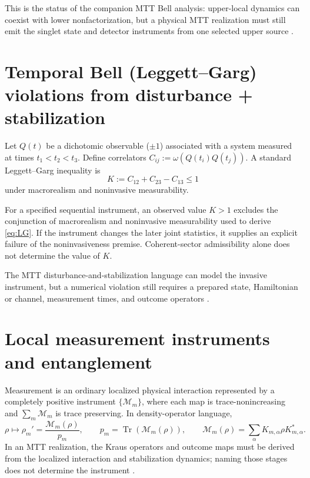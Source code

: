 \documentclass[11pt]{article}
\newcommand{\Tr}{\operatorname{Tr}}
\begin{document}
This is the status of the companion MTT Bell analysis: upper-local dynamics
can coexist with lower nonfactorization, but a physical MTT realization must
still emit the singlet state and detector instruments from one selected upper
source \cite{NeroBellBeables}.

\section{Temporal Bell (Leggett--Garg) violations from disturbance + stabilization}

Let $Q(t)$ be a dichotomic observable ($\pm 1$) associated with a system measured at times $t_1<t_2<t_3$.
Define correlators $C_{ij}:=\omega(Q(t_i)Q(t_j))$. A standard Leggett--Garg inequality is \cite{LeggettGarg1985}
\begin{equation}\label{eq:LG}
K := C_{12}+C_{23}-C_{13}\le 1
\end{equation}
under macrorealism and noninvasive measurability.

\begin{proposition}\label{prop:temporal}
For a specified sequential instrument, an observed value $K>1$ excludes the
conjunction of macrorealism and noninvasive measurability used to derive
\eqref{eq:LG}.  If the instrument changes the later joint statistics, it
supplies an explicit failure of the noninvasiveness premise.  Coherent-sector
admissibility alone does not determine the value of $K$.
\end{proposition}

\begin{remark}
The MTT disturbance-and-stabilization language can model the invasive
instrument, but a numerical violation still requires a prepared state,
Hamiltonian or channel, measurement times, and outcome operators
\cite{NeroTemporalBell,NeroMeasurement}.
\end{remark}

\section{Local measurement instruments and entanglement}

Measurement is an ordinary localized physical interaction represented by a
completely positive instrument $\{\mathcal M_m\}$, where each map is
trace-nonincreasing and $\sum_m\mathcal M_m$ is trace preserving.  In
density-operator language,
\begin{equation}\label{eq:instrument}
\rho \mapsto \rho_m'=\frac{\mathcal{M}_m(\rho)}{p_m},
\qquad p_m=\Tr(\mathcal M_m(\rho)),
\qquad
\mathcal{M}_m(\rho)=\sum_\alpha K_{m,\alpha}\rho K_{m,\alpha}^\ast.
\end{equation}
In an MTT realization, the Kraus operators and outcome maps must be derived
from the localized interaction and stabilization dynamics; naming those
stages does not determine the instrument \cite{NeroMeasurement}.
\end{document}
